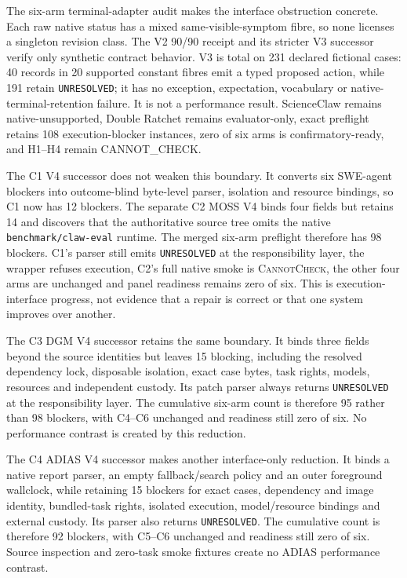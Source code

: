The six-arm terminal-adapter audit makes the interface obstruction concrete.
Each raw native status has a mixed same-visible-symptom fibre, so none licenses
a singleton revision class. The V2 90/90 receipt and its stricter V3 successor
verify only synthetic contract behavior. V3 is total on 231 declared fictional
cases: 40 records in 20 supported constant fibres emit a typed proposed action,
while 191 retain \texttt{UNRESOLVED}; it has no exception, expectation,
vocabulary or native-terminal-retention failure. It is not a performance
result. ScienceClaw remains native-unsupported, Double Ratchet remains
evaluator-only, exact preflight retains 108 execution-blocker instances, zero
of six arms is confirmatory-ready, and H1--H4 remain
\textsf{CANNOT\_CHECK}.

The C1 V4 successor does not weaken this boundary. It converts six SWE-agent
blockers into outcome-blind byte-level parser, isolation and resource bindings,
so C1 now has 12 blockers. The separate C2 MOSS V4 binds four fields but
retains 14 and discovers that the authoritative source tree omits the native
\texttt{benchmark/claw-eval} runtime. The merged six-arm preflight therefore
has 98 blockers. C1's parser
still emits \texttt{UNRESOLVED} at the responsibility layer, the wrapper
refuses execution, C2's full native smoke is \textsc{CannotCheck}, the other
four arms are unchanged and panel readiness remains zero of six. This is
execution-interface progress, not evidence that a repair is correct or that
one system improves over another.

The C3 DGM V4 successor retains the same boundary. It binds three fields beyond
the source identities but leaves 15 blocking, including the resolved dependency
lock, disposable isolation, exact case bytes, task rights, models, resources
and independent custody. Its patch parser always returns
\texttt{UNRESOLVED} at the responsibility layer. The cumulative six-arm count
is therefore 95 rather than 98 blockers, with C4--C6 unchanged and readiness
still zero of six. No performance contrast is created by this reduction.

The C4 ADIAS V4 successor makes another interface-only reduction. It binds a
native report parser, an empty fallback/search policy and an outer foreground
wallclock, while retaining 15 blockers for exact cases, dependency and image
identity, bundled-task rights, isolated execution, model/resource bindings and
external custody. Its parser also returns \texttt{UNRESOLVED}. The cumulative
count is therefore 92 blockers, with C5--C6 unchanged and readiness still zero
of six. Source inspection and zero-task smoke fixtures create no ADIAS
performance contrast.

